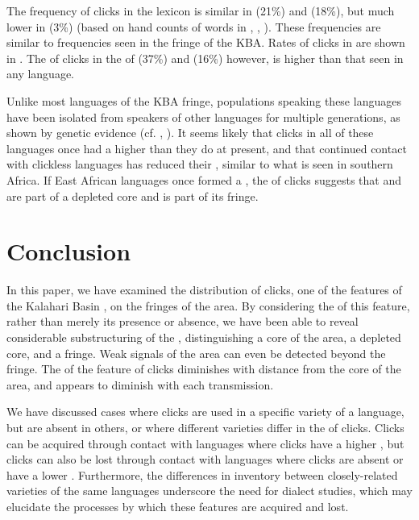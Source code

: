 \documentclass[output=paper
,newtxmath
,modfonts
,nonflat]{langsci/langscibook}
\begin{document}
The frequency of clicks in the lexicon is similar in  (21\%) and  (18\%), but much lower in  (3\%) (based on hand counts of words in \citealt{Miller2012}, \citealt{Ten2012}, \citealt{Tosco1991}). These frequencies are similar to frequencies seen in the fringe of the KBA. Rates of clicks in  are shown in . The  of clicks in the  of  (37\%) and  (16\%) however, is higher than that seen in any  language. 

Unlike most languages of the KBA fringe, populations speaking these languages have been isolated from speakers of other  languages for multiple generations, as shown by genetic evidence (cf. \citealt{Schlebush2012}, \citealt{Soi2015}). It seems likely that clicks in all of these languages once had a higher  than they do at present, and that continued contact with clickless languages has reduced their , similar to what is seen in southern Africa. If East African  languages once formed a , the  of clicks suggests that  and  are part of a depleted core and  is part of its fringe. 

\section{Conclusion}\label{sec:sands:7}

In this paper, we have examined the distribution of clicks, one of the features of the Kalahari Basin , on the fringes of the area. By considering the  of this feature, rather than merely its presence or absence, we have been able to reveal considerable substructuring of the , distinguishing a core of the area, a depleted core, and a fringe. Weak signals of the area can even be detected beyond the fringe. The  of the feature of clicks diminishes with distance from the core of the area, and appears to diminish with each transmission. 

We have discussed cases where clicks are used in a specific variety of a language, but are absent in others, or where different varieties differ in the  of clicks. Clicks can be acquired through contact with languages where clicks have a higher , but clicks can also be lost through contact with languages where clicks are absent or have a lower . Furthermore, the differences in  inventory between closely-related varieties of the same languages underscore the need for dialect studies, which may elucidate the processes by which these features are acquired and lost. 
\end{document}
